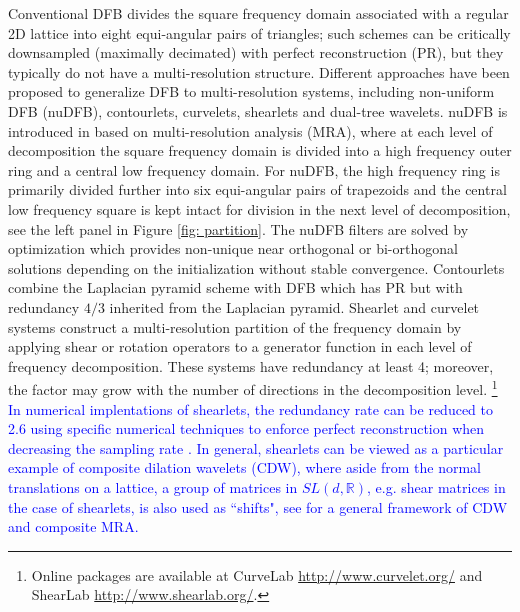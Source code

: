 Conventional DFB \cite{DFB92} divides the square frequency domain associated with a regular 2D lattice into eight equi-angular pairs of triangles; such schemes can be critically downsampled (maximally decimated) with perfect reconstruction (PR), but they typically do not have a multi-resolution structure. 
Different approaches have been proposed to generalize DFB to multi-resolution systems, including non-uniform DFB (nuDFB), contourlets, curvelets, shearlets and dual-tree wavelets.
nuDFB is introduced in \cite{nuDFB05} based on multi-resolution analysis (MRA), where at each level of decomposition the square frequency domain is divided into a high frequency outer ring and a central low frequency domain. For nuDFB, the high frequency ring is primarily divided further into six equi-angular pairs of trapezoids and the central low frequency square is kept intact for division in the next level of decomposition, see the left panel in Figure \ref{fig: partition}. The nuDFB filters are solved by optimization which provides non-unique near orthogonal or bi-orthogonal solutions depending on the initialization without stable convergence.
Contourlets \cite{do2005contourlet} combine the Laplacian pyramid scheme with DFB which has PR but with redundancy $4/3$ inherited from the Laplacian pyramid.
Shearlet \cite{shearlet12book,easley2008sparse} and curvelet \cite{candes2006fast} systems construct a multi-resolution partition of the frequency domain by applying shear or rotation operators to a generator function in each level of frequency decomposition. 
These systems have redundancy at least 4; moreover, the factor may grow with the number of directions in the decomposition level. \footnote{Online packages are available at CurveLab \url{http://www.curvelet.org/} and ShearLab \url{http://www.shearlab.org/}.}
\textcolor{blue}{In numerical implentations of shearlets, the redundancy rate can be reduced to 2.6 using specific numerical techniques to enforce perfect reconstruction when decreasing the sampling rate \cite{goossens2011design}.
In general, shearlets can be viewed as a particular example of composite dilation wavelets (CDW), where aside from the normal translations on a lattice, a group of matrices in $SL(d, \mathbb{R})$, e.g. shear matrices in the case of shearlets, is also used as ``shifts", see \cite{blanchard2012matricial} for a general framework of CDW and composite MRA.}
